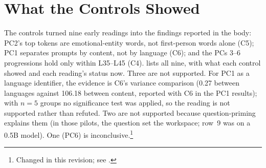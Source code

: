 \documentclass[11pt,a4paper]{article}
\begin{document}
\appendix
\section{What the Controls Showed}
\label{app:controls}

The controls turned nine early readings into the findings reported in the body: PC2's top tokens are emotional-entity words, not first-person words alone (C5); PC1 separates prompts by content, not by language (C6); and the PCs 3--6 progressions hold only within L35--L45 (C4).  lists all nine, with what each control showed and each reading's status now. Three are not supported. For PC1 as a language identifier, the evidence is C6's variance comparison (0.27 between languages against 106.18 between content, reported with C6 in the PC1 results); with $n = 5$ groups no significance test was applied, so the reading is not supported rather than refuted. Two are not supported because question-priming explains them (in those pilots, the question set the workspace; row~9 was on a 0.5B model). One (PC6) is inconclusive.\footnote{Changed in this revision; see .}
\end{document}
